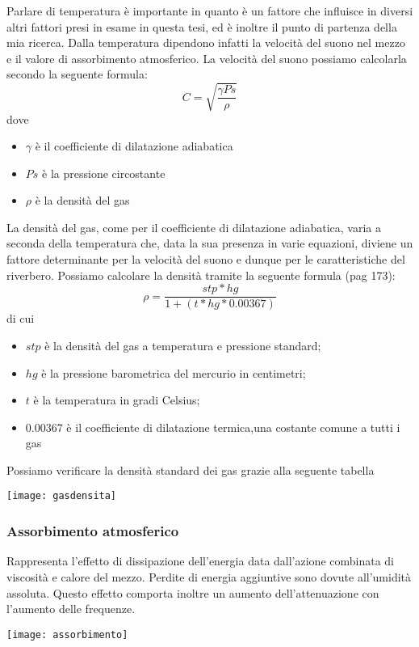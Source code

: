 Parlare di temperatura è importante in quanto è un fattore che influisce in diversi altri fattori presi in esame in questa tesi, ed è inoltre il punto di partenza della mia ricerca.
Dalla temperatura dipendono infatti la velocità del suono nel mezzo e il valore di assorbimento atmosferico.
La velocità del suono possiamo calcolarla secondo la seguente formula:
\begin{equation}
C=\sqrt{\frac{\gamma Ps}{\rho}}
\end{equation}
dove
\begin{itemize}
      \item $\gamma$ è il coefficiente di dilatazione adiabatica 
      \item $Ps$ è la pressione circostante
      \item $\rho$ è la densità del gas
\end{itemize}
La densità del gas, come per il coefficiente di dilatazione adiabatica, varia a seconda della temperatura che, data la sua presenza in varie equazioni, diviene un fattore determinante per la velocità del suono e dunque per le caratteristiche del riverbero.
Possiamo calcolare la densità tramite la seguente formula (pag 173):
\begin{equation}
\rho = \frac{stp*hg}{1+(t*hg*0.00367)}
\end{equation}
di cui
\begin{itemize}
      \item $stp$ è la densità del gas a temperatura e pressione standard;
      \item $hg$ è la pressione barometrica del mercurio in centimetri;
      \item $t$ è la temperatura in gradi Celsius;
      \item $0.00367$ è il  coefficiente di dilatazione termica,una costante comune a tutti i gas
\end{itemize}
Possiamo verificare la densità standard dei gas grazie alla seguente tabella 
\begin{center}
\texttt{[image: gasdensita]}
\end{center}
\subsubsection{Assorbimento atmosferico}
Rappresenta l’effetto di dissipazione dell’energia data dall’azione combinata di viscosità e calore del mezzo. Perdite di energia aggiuntive sono dovute all’umidità assoluta. Questo effetto comporta inoltre un aumento dell’attenuazione con l’aumento delle frequenze.
\begin{center}
\texttt{[image: assorbimento]}
\end{center}
